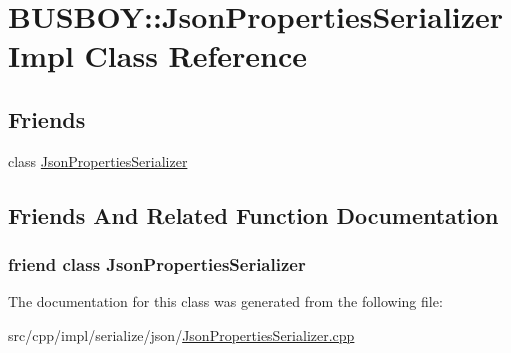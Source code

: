 \hypertarget{classBUSBOY_1_1JsonPropertiesSerializerImpl}{
\section{BUSBOY::JsonPropertiesSerializerImpl Class Reference}
\label{classBUSBOY_1_1JsonPropertiesSerializerImpl}
}
\subsection*{Friends}
\begin{DoxyCompactItemize}
\item 
class \hyperlink{classBUSBOY_1_1JsonPropertiesSerializerImpl_a01150df9727bb5372b7742984765b331}{JsonPropertiesSerializer}
\end{DoxyCompactItemize}


\subsection{Friends And Related Function Documentation}
\hypertarget{classBUSBOY_1_1JsonPropertiesSerializerImpl_a01150df9727bb5372b7742984765b331}{
\subsubsection[{JsonPropertiesSerializer}]{\setlength{\rightskip}{0pt plus 5cm}friend class {\bf JsonPropertiesSerializer}}}
\label{classBUSBOY_1_1JsonPropertiesSerializerImpl_a01150df9727bb5372b7742984765b331}


The documentation for this class was generated from the following file:\begin{DoxyCompactItemize}
\item 
src/cpp/impl/serialize/json/\hyperlink{JsonPropertiesSerializer_8cpp}{JsonPropertiesSerializer.cpp}\end{DoxyCompactItemize}
